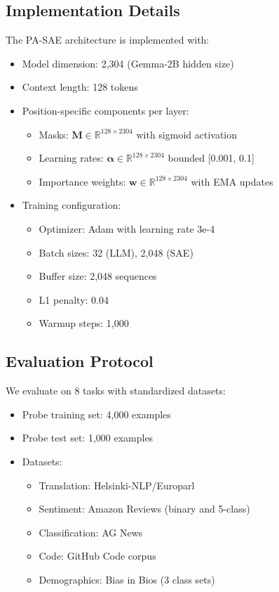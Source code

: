 \documentclass{article} %
\begin{document}
\subsection{Implementation Details}
The PA-SAE architecture is implemented with:
\begin{itemize}
    \item Model dimension: 2,304 (Gemma-2B hidden size)
    \item Context length: 128 tokens
    \item Position-specific components per layer:
        \begin{itemize}
            \item Masks: $\mathbf{M} \in \mathbb{R}^{128 \times 2304}$ with sigmoid activation
            \item Learning rates: $\boldsymbol{\alpha} \in \mathbb{R}^{128 \times 2304}$ bounded [0.001, 0.1]
            \item Importance weights: $\mathbf{w} \in \mathbb{R}^{128 \times 2304}$ with EMA updates
        \end{itemize}
    \item Training configuration:
        \begin{itemize}
            \item Optimizer: Adam with learning rate 3e-4
            \item Batch sizes: 32 (LLM), 2,048 (SAE)
            \item Buffer size: 2,048 sequences
            \item L1 penalty: 0.04
            \item Warmup steps: 1,000
        \end{itemize}
\end{itemize}

\subsection{Evaluation Protocol}
We evaluate on 8 tasks with standardized datasets:
\begin{itemize}
    \item Probe training set: 4,000 examples
    \item Probe test set: 1,000 examples
    \item Datasets:
        \begin{itemize}
            \item Translation: Helsinki-NLP/Europarl
            \item Sentiment: Amazon Reviews (binary and 5-class)
            \item Classification: AG News
            \item Code: GitHub Code corpus
            \item Demographics: Bias in Bios (3 class sets)
        \end{itemize}
\end{itemize}
\end{document}
